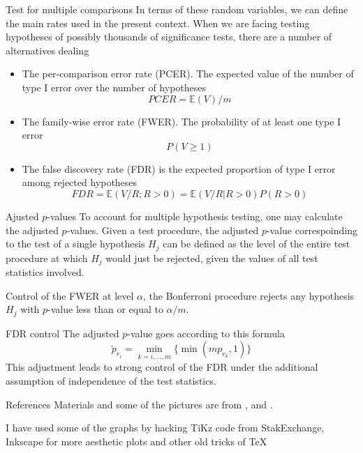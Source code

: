 \documentclass{beamer}
\begin{document}
\begin{frame}{Test for multiple comparisons}
	In terms of these random variables, we can define the main rates used in the present context.
When we are facing testing hypotheses of possibly thousands of significance tests, there are a 
number of alternatives dealing  	
\begin{itemize}
	\item The per-comparison error rate (PCER). The expected value of the number of type I error over the number of hypotheses
	\begin{equation*}
		PCER= \mathbb{E}(V)/m
	\end{equation*}
	\item The family-wise error rate (FWER). The probability of at least one type I error
	\begin{equation*}
		P(V\ge 1)
	\end{equation*}
	\item The false discovery rate (FDR) is the expected proportion of type I error among rejected hypotheses
	\begin{equation*}
		FDR=\mathbb{E}(V/R; R>0)=\mathbb{E}(V/R|R>0) P(R>0)
	\end{equation*}
\end{itemize}
\end{frame}


\begin{frame}{Ajusted $p$-values}
	To account for multiple hypothesis testing, one may calculate the adjusted $p$-values. Given a test procedure, the adjusted $p$-value correspoinding to the test of a single hypothesis $H_j$ can be defined as the level of the entire test procedure at which $H_j$ would just be rejected, given the values of all test statistics involved.
	
	Control of the FWER at level $\alpha$, the Bonferroni procedure rejects any hypothesis $H_j$ with $p$-value less than or equal to $\alpha/m$. 
\end{frame}

\begin{frame}{FDR control}
	The adjusted $p$-value goes according to this formula
	\begin{equation*}
		\tilde{p}_{r_i}= \min_{k=i,\ldots,m} \{ \min(mp_{r_k},1)\}
	\end{equation*}
	This adjustment leads to strong control of the FDR under the additional assumption of independence of the test statistics.
\end{frame}

\begin{frame}{References}
	Materials and some of the pictures are from \citep{pestman}, and \citep{speed}.
	\printbibliography 	
	
	I have used some of the graphs by hacking TiKz code from StakExchange, Inkscape for more aesthetic plots and other old tricks of \TeX
	
\end{frame}
\end{document}
